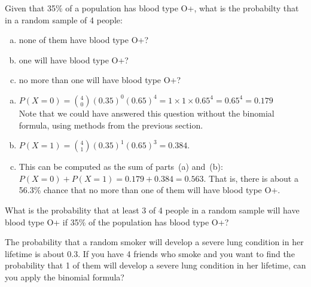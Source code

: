 \begin{examplewrap}
\begin{nexample}
{Given that 35\% of a population has blood type O+, what is the probabilty that in a random sample of 4 people:  
\begin{enumerate}[(a)]
\setlength{\itemsep}{0mm}
\item
    none of them have blood type O+?
\item
    one will have blood type O+?
\item
    no more than one will have blood type O+?
\end{enumerate}
}
\begin{enumerate}[(a)]
\item
  $P(X=0)
    = {4 \choose 0} (0.35)^0 (0.65)^4
    = 1\times1\times 0.65^4 = 0.65^4
    = 0.179$\\
Note that we could have answered this question without the binomial formula, using methods from the previous section.
\item 
  $P(X=1)
    = {4 \choose 1} (0.35)^1(0.65)^{3}
    = 0.384$.
  \item This can be computed as the sum of parts~(a) and~(b):
  $P(X=0) + P(X=1) = 0.179 + 0.384 = 0.563$.
  That is, there is about a 56.3\% chance that no more than
  one of them will have blood type O+.
\end{enumerate}
\label{bloodTypeOPos}
\end{nexample}
\end{examplewrap}


\begin{exercisewrap}
\begin{nexercise}
What is the probability that at least 3 of 4 people in a random sample will have blood type O+ if 35\% of the population has blood type O+?\footnotemark
\end{nexercise}
\end{exercisewrap}


 \begin{exercisewrap}
\begin{nexercise}
The probability that a random smoker will develop a severe
lung condition in her lifetime is about $0.3$.
If you have 4 friends who smoke and you want to find the probability that 1 of them will develop a severe lung condition in her lifetime, can you apply the binomial formula?\footnotemark
\end{nexercise}
\end{exercisewrap}




